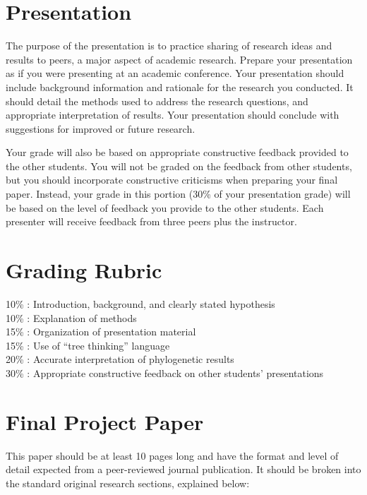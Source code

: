\documentclass[12pt]{article}
\begin{document}
\section{Presentation}

The purpose of the presentation is to practice sharing of research ideas and results to peers, a major aspect of academic research.
Prepare your presentation as if you were presenting at an academic conference. 
Your presentation should include background information and rationale for the research you conducted.
It should detail the methods used to address the research questions, and appropriate interpretation of results.
Your presentation should conclude with suggestions for improved or future research.

Your grade will also be based on appropriate constructive feedback provided to the other students. 
You will not be graded on the feedback from other students, but you should incorporate constructive criticisms when preparing your final paper. 
Instead, your grade in this portion (30\% of your presentation grade) will be based on the level of feedback you provide to the other students.
Each presenter will receive feedback from three peers plus the instructor.

\section{Grading Rubric}

10\% : Introduction, background, and clearly stated hypothesis \\
10\% : Explanation of methods\\
15\% : Organization of presentation material\\
15\% : Use of ``tree thinking'' language\\
20\% : Accurate interpretation of phylogenetic results\\
30\% : Appropriate constructive feedback on other students' presentations\\



\section{Final Project Paper}

This paper should be at least 10 pages long and have the format and level of detail expected from a peer-reviewed journal publication. 
It should be broken into the standard original research sections, explained below:
\end{document}
